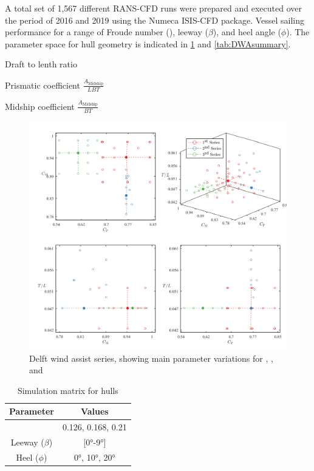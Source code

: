 \documentclass[twoside,twocolumn]{article}
\begin{document}
A total set of 1,567 different RANS-CFD runs were prepared and executed over the period of 2016 and 2019 using the Numeca ISIS-CFD package. Vessel sailing performance for a range of Froude number (\Fn), leeway ($\beta$), and heel angle ($\phi$). The parameter space for hull geometry is indicated in \cref{fig:DWA} and \cref{tab:DWAsummary}.

\begin{description}[leftmargin=1cm]
	
	\item[\TL]{Draft to lenth ratio}
	\item[\Cp]{Prismatic coefficient $\frac{A_{\mathrm{Midship}}}{LBT}$}
	\item[\Cm]{Midship coefficient $\frac{A_{\mathrm{Midship}}}{BT}$}
\end{description}


\begin{figure}[!ht]
	\centering
	\includegraphics[width=\textwidth]{images/DWAseries.png}  %
	\caption{Delft wind assist series, showing main parameter variations for \TL, \Cp, and \Cm}
	\label{fig:DWA}
\end{figure}

\begin{table}[]
	\caption{Simulation matrix for \DWA hulls}
	\label{tab:parameters}
	\begin{tabular}{@{}cc@{}}
		\toprule
		\textbf{Parameter} & \textbf{Values} \\ \midrule
		\Fn & 0.126, 0.168, 0.21 \\
		Leeway ($\beta$) & [\ang{0}-\ang{9}] \\
		Heel ($\phi$) & \ang{0}, \ang{10}, \ang{20} \\ \bottomrule
	\end{tabular}
\end{table}
\end{document}

